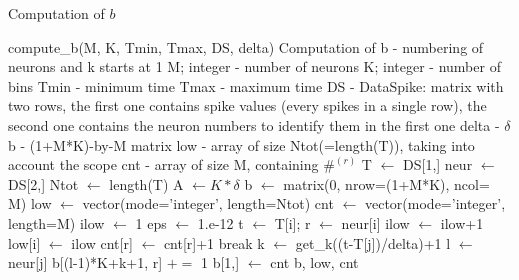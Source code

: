 \documentclass{article}
\def\Tmin{T_{\min}}
\def\Tmax{T^{\max}}
\begin{document}
  \begin{algorithm}[!h]
\caption{Computation of $b$}
\begin{algorithmic}[1] 
\Use compute\_b(M, K, Tmin, Tmax, DS, delta)
  \Desc Computation of b - numbering of neurons and k starts at 1
  \Input M; integer - number of neurons
  \Input K; integer - number of bins
\Input Tmin - minimum time
\Input Tmax - maximum time
\Input DS - DataSpike: matrix with two rows, the first one contains spike values (every spikes in a single row), the second one contains the neuron numbers to identify them in the first one
\Input delta - $\delta$
\Output b - (1+M*K)-by-M matrix%
\Output low - array of size Ntot(=length(T)), taking into account the scope
\Output cnt - array of size M, containing $\#^{(r)}$
\State T $\gets$ DS[1,]  
\State neur $\gets$ DS[2,] 
\State Ntot $\gets$ length(T) 
\State A $\gets K*\delta$ 
\State b $\gets$ matrix(0, nrow=(1+M*K), ncol= M) 
\State low $\gets$ vector(mode='integer', length=Ntot) 
\State cnt $\gets$ vector(mode='integer', length=M) 
\State ilow $\gets$ 1
\State eps $\gets$ 1.e-12 
 
\State t $\gets$ T[i]; r $\gets$ neur[i]
\State ilow $\gets$ ilow+1
\EndWhile
\State low[i] $\gets$ ilow
\If{($\Tmin<t\leq\Tmax$)}
\State cnt[r] $\gets$ cnt[r]+1
\State break
\EndIf
\State k $\gets$ get\_k((t-T[j])/delta)+1 
\State l $\gets$ neur[j]
\State b[(l-1)*K+k+1, r] $\mathrel{+}=$ 1
\EndFor
\EndIf
\EndFor
\State b[1,]  $\gets$ cnt 
\State \Return b, low, cnt
\end{algorithmic}
\end{algorithm}
\clearpage
\vspace*{-2cm}
\end{document}
